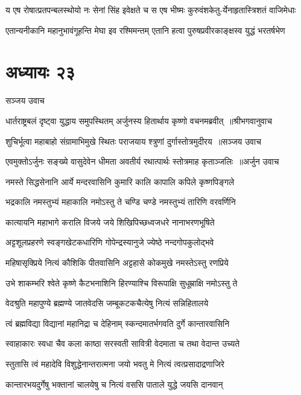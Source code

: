 \twolineshloka
{य एष रोषात्प्रतपन्बलस्थोयो नः सेनां सिंह इवेक्षते च}
{स एष भीष्मः कुरुवंशकेतु-र्येनाहृतास्त्रिशतं वाजिमेधाः}


\twolineshloka
{एतान्यनीकानि महानुभावंगूहन्ति मेघा इव रश्मिमन्तम्}
{एतानि हत्वा पुरुषप्रवीरकाङ्क्षस्व युद्धं भरतर्षभेण}


\chapter{अध्यायः २३}
\twolineshloka
{सञ्जय उवाच}
{}


\threelineshloka
{धार्तराष्ट्रबलं दृष्ट्वा युद्धाय समुपस्थितम्}
{अर्जुनस्य हितार्थाय कृष्णो वचनमब्रवीत् ॥श्रीभगवानुवाच}
{}


\threelineshloka
{शुचिर्भूत्वा महाबाहो संग्रामाभिमुखे स्थितः}
{पराजयाय श्त्रुणां दुर्गास्तोत्रमुदीरय ॥सञ्जय उवाच}
{}


\threelineshloka
{एवमुक्तोऽर्जुनः सङ्ख्ये वासुदेवेन धीमता}
{अवतीर्य रथात्पार्थः स्तोत्रमाह कृताञ्जलिः ॥अर्जुन उवाच}
{}


\twolineshloka
{नमस्ते सिद्धसेनानि आर्ये मन्दरवासिनि}
{कुमारि कालि कापालि कपिले कृष्णपिङ्गले}


\twolineshloka
{भद्रकालि नमस्तुभ्यं महाकालि नमोऽस्तु ते}
{चण्डि चण्डे नमस्तुभ्यं तारिणि वरवर्णिनि}


\twolineshloka
{कात्यायनि महाभागे करालि विजये जये}
{शिखिपिच्छध्वजधरे नानाभरणभूषिते}


\twolineshloka
{अट्टशूलप्रहरणे स्वङ्गखेटकधारिणि}
{गोपेन्द्रस्यानुजे ज्येष्ठे नन्दगोपकुलोद्भवे}


\twolineshloka
{महिषासृक्प्रिये नित्यं कौशिकि पीतवासिनि}
{अट्टहासे कोकमुखे नमस्तेऽस्तु रणप्रिये}


\twolineshloka
{उभे शाकम्भरि श्वेते कृष्णे कैटभनाशिनि}
{हिरण्याश्चि विरूपाक्षि सुधूम्राक्षि नमोऽस्तु ते}


\twolineshloka
{वेदश्रुति महापुण्ये ब्रह्मण्ये जातवेदसि}
{जम्बूकटकचैत्येषु नित्यं सन्निहितालये}


\twolineshloka
{त्वं ब्रह्मविद्या विद्यानां महानिद्रा च देहिनाम्}
{स्कन्दमातर्भगवति दुर्गे कान्तारवासिनि}


\twolineshloka
{स्वाहाकारः स्वधा चैव कला काष्ठा सरस्वती}
{सावित्री वेदमाता च तथा वेदान्त उच्यते}


\twolineshloka
{स्तुतासि त्वं महादेवि विशुद्धेनान्तरात्मना}
{जयो भवतु मे नित्यं त्वत्प्रसादाद्रणाजिरे}


\twolineshloka
{कान्तारभयदुर्गेषु भक्तानां चालयेषु च}
{नित्यं वससि पाताले युद्धे जयसि दानवान्}



